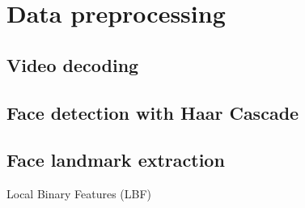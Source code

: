 \section{Data preprocessing}
\label{sec:Data preprocessing}

\subsection{Video decoding}

\subsection{Face detection with Haar Cascade}

\subsection{Face landmark extraction}
Local Binary Features (LBF)
